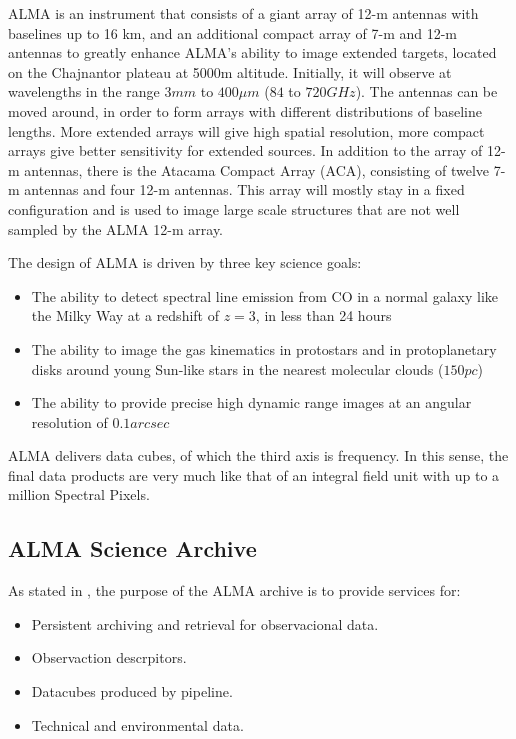 ALMA is an instrument that consists of a giant array of 12-m antennas with baselines up to 16 km, and an additional compact array of 7-m and 12-m antennas to greatly enhance ALMA's ability to image extended targets, located on the Chajnantor plateau at 5000m altitude. Initially, it will observe at wavelengths in the range $3 mm$ to $400 μm$ ($84$ to $720 GHz$). The antennas can be moved around, in order to form arrays with different distributions of baseline lengths. More extended arrays will give high spatial resolution, more compact arrays give better sensitivity for extended sources. In addition to the array of 12-m antennas, there is the Atacama Compact Array (ACA), consisting of twelve 7-m antennas and four 12-m antennas. This array will mostly stay in a fixed configuration and is used to image large scale structures that are not well sampled by the ALMA 12-m array. \newline

The design of ALMA is driven by three key science goals:

\begin{itemize}

\item The ability to detect spectral line emission from CO in a normal galaxy like the Milky Way at a redshift of $z=3$, in less than 24 hours

\item The ability to image the gas kinematics in protostars and in protoplanetary disks around young Sun-like stars in the nearest molecular clouds ($150 pc$)

\item The ability to provide precise high dynamic range images at an angular resolution of $0.1 arcsec$
\end{itemize}
 
ALMA delivers data cubes, of which the third axis is frequency. In this sense, the final data products are very much like that of an integral field unit with up to a million Spectral Pixels.

\subsection{ALMA Science Archive}

As stated in \cite{Etoka12}, the purpose of the ALMA archive is to provide services for:

\begin{itemize}
\item Persistent archiving and retrieval for observacional data.
\item Observaction descrpitors.
\item Datacubes produced by pipeline.
\item Technical and environmental data.
\end{itemize}

